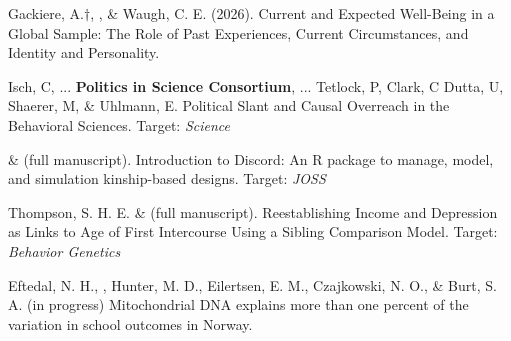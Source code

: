\begin{etaremune}

\item Gackiere, A.$\dagger$, \meb, \& Waugh, C. E. (2026). Current and Expected Well-Being in a Global Sample: The Role of Past Experiences, Current Circumstances, and Identity and Personality. \href{https://osf.io/preprints/psyarxiv/cd2hn_v2/}{\small\color{blue}{osf.io/preprints/psyarxiv/cd2hn\_v2/}}


\item  Isch, C, ... \textbf{Politics in Science Consortium}, ... Tetlock, P,  Clark, C   Dutta, U,  Shaerer, M, \&  Uhlmann, E. Political Slant and Causal Overreach in the Behavioral Sciences. Target: \textit{Science}

\item \jt \& \meb (full manuscript). Introduction to Discord: An R package to manage, model, and simulation kinship-based designs. Target: \textit{JOSS}


\item Thompson, S. H. E. \noteA \& \meb (full manuscript). Reestablishing Income and Depression as Links to Age of First Intercourse Using a Sibling Comparison Model. Target: \textit{Behavior Genetics}

\item Eftedal, N. H., \meb, Hunter, M. D., Eilertsen, E. M., Czajkowski, N. O., \& Burt, S. A. (in progress) Mitochondrial DNA explains more than one percent of the variation in school outcomes in Norway.





%
%


\end{etaremune}
